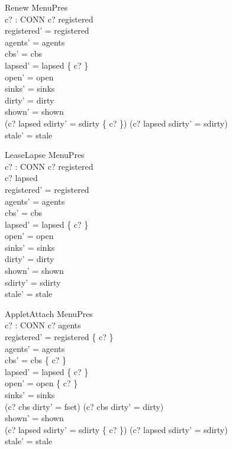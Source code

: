 \documentclass[a4paper,10pt,fleqn]{article}
\begin{document}
\begin{schema}{Renew}
  \Delta MenuPres \\
  c? : CONN
\where
  c? \in registered \\
  registered' = registered \\
  agents' = agents \\
  cbs' = cbs \\
  lapsed' = lapsed \setminus \{ c? \} \\
  open' = open \\
  sinks' = sinks \\
  dirty' = dirty \\
  shown' = shown \\
  (c? \in lapsed \land sdirty' = sdirty \cup \{ c? \}) \lor
    (c? \notin lapsed \land sdirty' = sdirty) \\
  stale' = stale
\end{schema}

\begin{schema}{LeaseLapse}
  \Delta MenuPres \\
  c? : CONN
\where
  c? \in registered \\
  c? \notin lapsed \\
  registered' = registered \\
  agents' = agents \\
  cbs' = cbs \\
  lapsed' = lapsed \cup \{ c? \} \\
  open' = open \\
  sinks' = sinks \\
  dirty' = dirty \\
  shown' = shown \\
  sdirty' = sdirty \\
  stale' = stale
\end{schema}

\begin{schema}{AppletAttach}
  \Delta MenuPres \\
  c? : CONN
\where
  c? \notin agents \\
  registered' = registered \cup \{ c? \} \\
  agents' = agents \\
  cbs' = cbs \setminus \{ c? \} \\
  lapsed' = lapsed \setminus \{ c? \} \\
  open' = open \cup \{ c? \} \\
  sinks' = sinks \\
  (c? \in cbs \land dirty' = fset) \lor (c? \notin cbs \land dirty' = dirty) \\
  shown' = shown \\
  (c? \in lapsed \land sdirty' = sdirty \cup \{ c? \}) \lor
    (c? \notin lapsed \land sdirty' = sdirty) \\
  stale' = stale
\end{schema}
\end{document}

